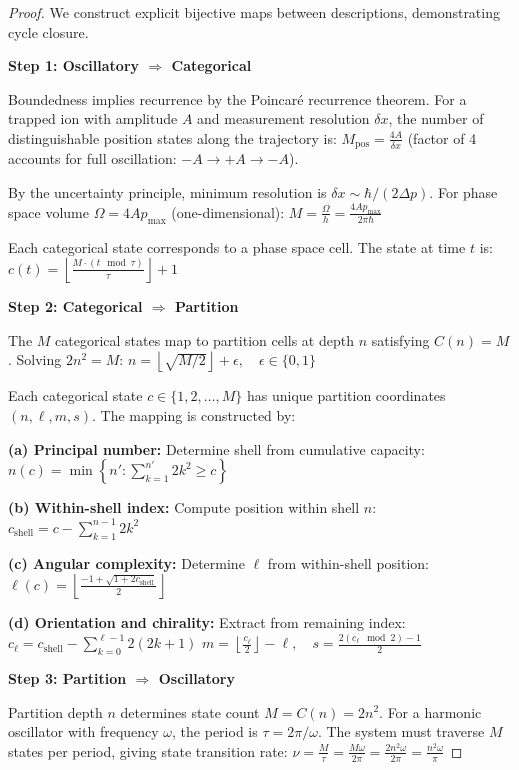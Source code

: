 \documentclass[twocolumn,10pt]{article}
\begin{document}
\begin{proof}
We construct explicit bijective maps between descriptions, demonstrating cycle closure.

\textbf{Step 1: Oscillatory $\Rightarrow$ Categorical}

Boundedness implies recurrence by the Poincaré recurrence theorem. For a trapped ion with amplitude $A$ and measurement resolution $\delta x$, the number of distinguishable position states along the trajectory is:
$
M_{\mathrm{pos}} = \frac{4A}{\delta x}
$
(factor of 4 accounts for full oscillation: $-A \to +A \to -A$).

By the uncertainty principle, minimum resolution is $\delta x \sim \hbar/(2\Delta p)$. For phase space volume $\Omega = 4Ap_{\max}$ (one-dimensional):
$
M = \frac{\Omega}{h} = \frac{4Ap_{\max}}{2\pi\hbar}
$

Each categorical state corresponds to a phase space cell. The state at time $t$ is:
$
c(t) = \left\lfloor \frac{M \cdot (t \mod \tau)}{\tau} \right\rfloor + 1
$

\textbf{Step 2: Categorical $\Rightarrow$ Partition}

The $M$ categorical states map to partition cells at depth $n$ satisfying $C(n) = M$. Solving $2n^2 = M$:
$
n = \left\lfloor \sqrt{M/2} \right\rfloor + \epsilon, \quad \epsilon \in \{0, 1\}
$

Each categorical state $c \in \{1, 2, \ldots, M\}$ has unique partition coordinates $(n, \ell, m, s)$. The mapping is constructed by:

\textbf{(a) Principal number:} Determine shell from cumulative capacity:
$
n(c) = \min\left\{n' : \sum_{k=1}^{n'} 2k^2 \geq c\right\}
$

\textbf{(b) Within-shell index:} Compute position within shell $n$:
$
c_{\mathrm{shell}} = c - \sum_{k=1}^{n-1} 2k^2
$

\textbf{(c) Angular complexity:} Determine $\ell$ from within-shell position:
$
\ell(c) = \left\lfloor \frac{-1 + \sqrt{1 + 2c_{\mathrm{shell}}}}{2} \right\rfloor
$

\textbf{(d) Orientation and chirality:} Extract from remaining index:
$
c_{\ell} = c_{\mathrm{shell}} - \sum_{k=0}^{\ell-1} 2(2k+1)
$
$
m = \left\lfloor \frac{c_{\ell}}{2} \right\rfloor - \ell, \quad s = \frac{2(c_{\ell} \mod 2) - 1}{2}
$

\textbf{Step 3: Partition $\Rightarrow$ Oscillatory}

Partition depth $n$ determines state count $M = C(n) = 2n^2$. For a harmonic oscillator with frequency $\omega$, the period is $\tau = 2\pi/\omega$. The system must traverse $M$ states per period, giving state transition rate:
$
\nu = \frac{M}{\tau} = \frac{M\omega}{2\pi} = \frac{2n^2\omega}{2\pi} = \frac{n^2\omega}{\pi}
$


\end{proof}
\end{document}

